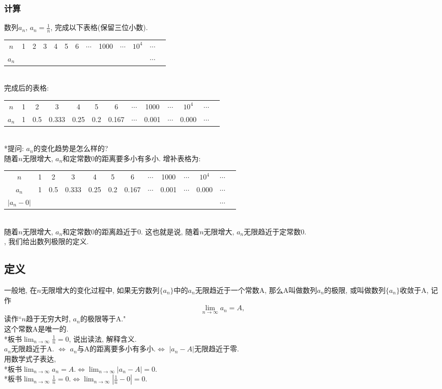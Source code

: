 \documentclass{article}
\begin{document}
\begin{CJK}{UTF8}{gkai}
\subsubsection{计算}
数列${a_n}$, $a_n = \frac{1}{n}$, 完成以下表格(保留三位小数). \\
\begin{tabular}{| c | c | c | c | c | c | c | c | c | c | c | c | c |}
  $n$     & 1 & 2 & 3 & 4 & 5 & 6 & $\cdots$ & 1000 & $\cdots$ & $10^4$ & $\cdots$\\
  $a_n$ &&&&&&&&&&&$\cdots$\\  
\end{tabular}\\
完成后的表格: \\
\begin{tabular}{| c | c | c | c | c | c | c | c | c | c | c | c | c |}
  $n$     & 1 & 2 & 3 & 4 & 5 & 6 & $\cdots$ & 1000 & $\cdots$ & $10^4$ & $\cdots$\\
  $a_n$ & 1 & 0.5 & 0.333 & 0.25 & 0.2 & 0.167 & $\cdots$ & 0.001 & $\cdots$ & 0.000 & $\cdots$\\  
\end{tabular}\\
*提问: $a_n$的变化趋势是怎么样的?\\
随着$n$无限增大, $a_n$和定常数0的距离要多小有多小. 增补表格为: \\
\begin{tabular}{| c | c | c | c | c | c | c | c | c | c | c | c | c |}
  $n$     & 1 & 2 & 3 & 4 & 5 & 6 & $\cdots$ & 1000 & $\cdots$ & $10^4$ & $\cdots$\\
  $a_n$ & 1 & 0.5 & 0.333 & 0.25 & 0.2 & 0.167 & $\cdots$ & 0.001 & $\cdots$ & 0.000 & $\cdots$\\  
  $| a_n - 0 |$ &&&&&&&&&&&$\cdots$
\end{tabular}\\
随着$n$无限增大, $a_n$和定常数0的距离趋近于0. 这也就是说, 随着$n$无限增大, $a_n$无限趋近于定常数0.\\
, 我们给出数列极限的定义.\\

\subsection{定义}
一般地, 在$n$无限增大的变化过程中, 如果无穷数列$\{a_n\}$中的$a_n$无限趋近于一个常数A,  那么A叫做数列${a_n}$的极限, 或叫做数列$\{a_n\}$收敛于A, 记作$$\lim_{n \to \infty}{a_n} = A,$$
读作``$n$趋于无穷大时, $a_n$的极限等于A."\\
这个常数A是唯一的.\\
*板书$\lim_{n \to \infty}{\frac{1}{n}} = 0$, 说出读法, 解释含义.\\
\newline
$a_n$无限趋近于A. $\iff$ $a_n$与A的距离要多小有多小.$ \iff $ $|a_n - A|$无限趋近于零.\\
用数学式子表达,\\
*板书$\lim_{n \to \infty}{a_n} = A.\iff \lim_{n \to \infty}{|a_n - A|} = 0.$\\
*板书$\lim_{n \to \infty}{\frac{1}{n}} = 0.\iff \lim_{n \to \infty}{|\frac{1}{n} - 0|} = 0.$


\end{CJK}
\end{document}
